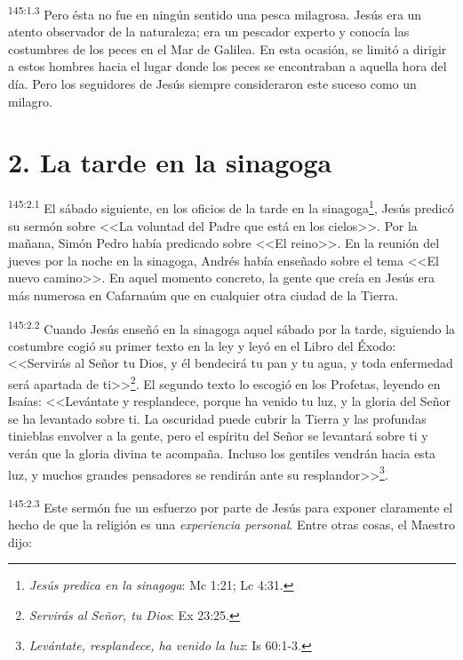 \par 
\textsuperscript{145:1.3} Pero ésta no fue en ningún sentido una pesca milagrosa. Jesús era un atento observador de la naturaleza; era un pescador experto y conocía las costumbres de los peces en el Mar de Galilea. En esta ocasión, se limitó a dirigir a estos hombres hacia el lugar donde los peces se encontraban a aquella hora del día. Pero los seguidores de Jesús siempre consideraron este suceso como un milagro.

\section*{2. La tarde en la sinagoga}
\par 
\textsuperscript{145:2.1} El sábado siguiente, en los oficios de la tarde en la sinagoga\footnote{\textit{Jesús predica en la sinagoga}: Mc 1:21; Lc 4:31.}, Jesús predicó su sermón sobre <<La voluntad del Padre que está en los cielos>>. Por la mañana, Simón Pedro había predicado sobre <<El reino>>. En la reunión del jueves por la noche en la sinagoga, Andrés había enseñado sobre el tema <<El nuevo camino>>. En aquel momento concreto, la gente que creía en Jesús era más numerosa en Cafarnaúm que en cualquier otra ciudad de la Tierra.

\par 
\textsuperscript{145:2.2} Cuando Jesús enseñó en la sinagoga aquel sábado por la tarde, siguiendo la costumbre cogió su primer texto en la ley y leyó en el Libro del Éxodo: <<Servirás al Señor tu Dios, y él bendecirá tu pan y tu agua, y toda enfermedad será apartada de ti>>\footnote{\textit{Servirás al Señor, tu Dios}: Ex 23:25.}. El segundo texto lo escogió en los Profetas, leyendo en Isaías: <<Levántate y resplandece, porque ha venido tu luz, y la gloria del Señor se ha levantado sobre ti. La oscuridad puede cubrir la Tierra y las profundas tinieblas envolver a la gente, pero el espíritu del Señor se levantará sobre ti y verán que la gloria divina te acompaña. Incluso los gentiles vendrán hacia esta luz, y muchos grandes pensadores se rendirán ante su resplandor>>\footnote{\textit{Levántate, resplandece, ha venido la luz}: Is 60:1-3.}.

\par 
\textsuperscript{145:2.3} Este sermón fue un esfuerzo por parte de Jesús para exponer claramente el hecho de que la religión es una \textit{experiencia personal}. Entre otras cosas, el Maestro dijo:

